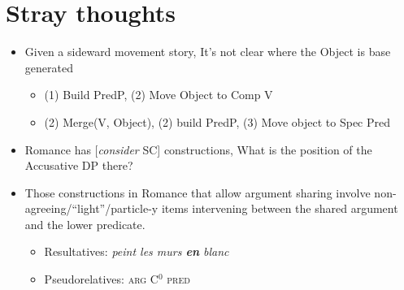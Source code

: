 \documentclass[letterpaper]{article}
\begin{document}
\section{Stray thoughts}
\begin{itemize}
  \item Given a sideward movement story, It's not clear where the Object is base generated
    \begin{itemize}
      \item (1) Build PredP, (2) Move Object to Comp V
      \item (2) Merge(V, Object), (2) build PredP, (3) Move object to Spec Pred
    \end{itemize}
  \item Romance has [\textit{consider} SC] constructions, What is the position of the Accusative DP there?
  \item Those constructions in Romance that allow argument sharing involve non-agreeing/``light''/particle-y items intervening between the shared argument and the lower predicate.
    \begin{itemize}
      \item Resultatives: \textit{peint les murs \textbf{en} blanc}
      \item Pseudorelatives: \textsc{arg} C$^0$ \textsc{pred}
    \end{itemize}
\end{itemize}
\end{document}
